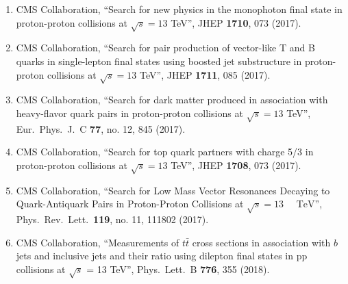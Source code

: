 \begin{itemize}
\begin{enumerate}
\item CMS Collaboration, ``Search for new physics in the monophoton final state in proton-proton collisions at $ \sqrt{s}=13 $ TeV'', JHEP {\bf 1710}, 073 (2017).

\item CMS Collaboration, ``Search for pair production of vector-like T and B quarks in single-lepton final states using boosted jet substructure in proton-proton collisions at  $\sqrt{s}=13$ TeV'', JHEP {\bf 1711}, 085 (2017).

\item CMS Collaboration, ``Search for dark matter produced in association with heavy-flavor quark pairs in proton-proton collisions at $\sqrt{s}=13$ TeV'', Eur.\ Phys.\ J.\ C {\bf 77}, no. 12, 845 (2017).

\item CMS Collaboration, ``Search for top quark partners with charge 5/3 in proton-proton collisions at $ \sqrt{s}=13 $ TeV'', JHEP {\bf 1708}, 073 (2017).

\item CMS Collaboration, ``Search for Low Mass Vector Resonances Decaying to Quark-Antiquark Pairs in Proton-Proton Collisions at $\sqrt{s}=13\text{ }\text{ }\mathrm{TeV}$'', Phys.\ Rev.\ Lett.\  {\bf 119}, no. 11, 111802 (2017).

\item CMS Collaboration, ``Measurements of $t\bar{t}$ cross sections in association with $b$ jets and inclusive jets and their ratio using dilepton final states in pp collisions at $\sqrt{s}$ = 13 TeV'', Phys.\ Lett.\ B {\bf 776}, 355 (2018).


\end{enumerate}
\end{itemize}
